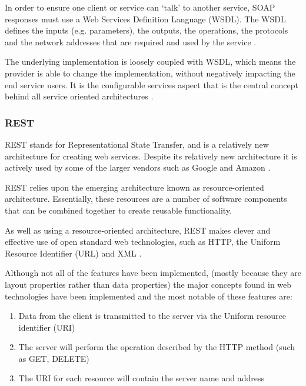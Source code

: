 In order to ensure one client or service can `talk' to another service, SOAP 
responses must use a Web Services Definition Language (WSDL). The WSDL defines 
the inputs (e.g. parameters), the outputs, the operations, the protocols and 
the network addresses that are required and used by the service 
\citep{gershon04}.

The underlying implementation is loosely coupled with WSDL, which means the 
provider is able to change the implementation, without negatively impacting 
the end service users. It is the configurable services aspect that is the 
central concept behind all service oriented architectures \citep{gershon04}. 


\subsubsection{REST}

REST stands for Representational State Transfer, and is a relatively new 
architecture for creating web services. Despite its relatively new architecture
it is actively used by some of the larger vendors such as Google and Amazon 
\citep{dospinescu13}.

REST relies upon the emerging architecture known as resource-oriented 
architecture. Essentially, these resources are a number of software components 
that can be combined together to create reusable functionality.

As well as using a resource-oriented architecture, REST makes clever and 
effective use of open standard web technologies, such as HTTP, the Uniform Resource Identifier (URL) and XML \citep{dospinescu13}.

Although not all of the features have been implemented, (mostly because they 
are layout properties rather than data properties) the major concepts found in
web technologies have been implemented and the most notable of these features 
are:

\begin{enumerate}
  \item Data from the client is transmitted to the server via the Uniform resource identifier (URI)
  \item The server will perform the operation described by the HTTP method 
  (such as GET, DELETE)
  \item The URI for each resource will contain the server name and address
\end{enumerate}

